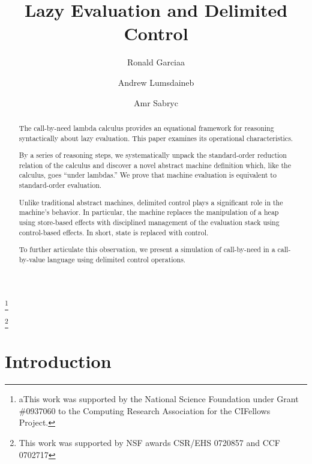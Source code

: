 \documentclass{LMCS}
\theoremstyle{plain}
\theoremstyle{remark}
\begin{document}
\title{Lazy Evaluation and Delimited Control}

\author[R.~Garcia]{Ronald Garcia\rsuper a}
\address{{\lsuper a}Carnegie Mellon University}
\thanks{{\lsuper a}This work was supported by the National Science Foundation under
  Grant \#0937060 to the Computing Research Association for the CIFellows
  Project.}

\author[A.~Lumsdaine]{Andrew Lumsdaine\rsuper b} 
\address{{}Indiana University}
\thanks{{}This work was supported by NSF awards CSR/EHS 0720857 and CCF 0702717}
\author[A.~Sabry]{Amr Sabry\rsuper c} 
\address{ pt}






\begin{abstract}

  The call-by-need lambda calculus provides an equational framework for
  reasoning syntactically about lazy evaluation.  This paper
  examines its operational characteristics.

  By a series of reasoning steps, we systematically unpack the standard-order
  reduction relation of the calculus and discover a novel abstract machine
  definition which, like the calculus, goes ``under lambdas.''  We prove that
  machine evaluation is equivalent to standard-order evaluation.

  Unlike traditional abstract machines, delimited control plays a significant
  role in the machine's behavior.  In particular, the machine replaces the
  manipulation of a heap using store-based effects with disciplined management
  of the evaluation stack using control-based effects.  In short, state is
  replaced with control.

  To further articulate this observation, we present a simulation of
  call-by-need in a call-by-value language using delimited control operations.
\end{abstract}




\maketitle





\section{Introduction}
\label{sec:intro}
\end{document}
